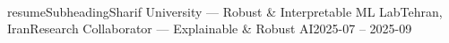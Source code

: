 \\resumeSubheading{Sharif University — Robust & Interpretable ML Lab}{Tehran, Iran}{Research Collaborator — Explainable & Robust AI}{2025-07 -- 2025-09}
